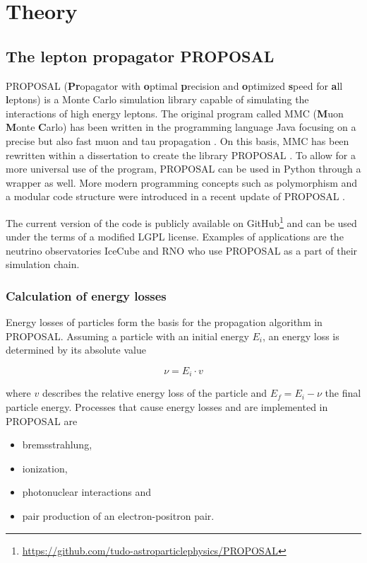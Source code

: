 \chapter{Theory}

\section{The lepton propagator PROPOSAL}

PROPOSAL (\textbf{Pr}opagator with \textbf{o}ptimal \textbf{p}recision and \textbf{o}ptimized \textbf{s}peed for \textbf{a}ll \textbf{l}eptons) is a Monte Carlo simulation library capable of simulating the interactions of high energy leptons.
The original program called MMC (\textbf{M}uon \textbf{M}onte \textbf{C}arlo) has been written in the programming language Java focusing on a precise but also fast muon and tau propagation \cite{chirkin2004propagating}.
On this basis, MMC has been rewritten within a dissertation to create the \CC library PROPOSAL \cite{Kohne:2013zbq}.
To allow for a more universal use of the program, PROPOSAL can be used in Python through a wrapper as well.
More modern programming concepts such as polymorphism and a modular code structure were introduced in a recent update of PROPOSAL \cite{dunsch_2018_proposal_improvements}.

The current version of the code is publicly available on GitHub\footnote{\url{https://github.com/tudo-astroparticlephysics/PROPOSAL}} and can be used under the terms of a modified LGPL license.
Examples of applications are the neutrino observatories IceCube and RNO who use PROPOSAL as a part of their simulation chain.

\subsection{Calculation of energy losses}

Energy losses of particles form the basis for the propagation algorithm in PROPOSAL.
Assuming a particle with an initial energy $E_i$, an energy loss is determined by its absolute value

\begin{equation}
	\nu = E_i \cdot v
\end{equation}

where $v$ describes the relative energy loss of the particle and $E_f = E_i - \nu$ the final particle energy.
Processes that cause energy losses and are implemented in PROPOSAL are

\begin{itemize}
	\item bremsstrahlung,
	\item ionization,
	\item photonuclear interactions and
	\item pair production of an electron-positron pair.
\end{itemize}

